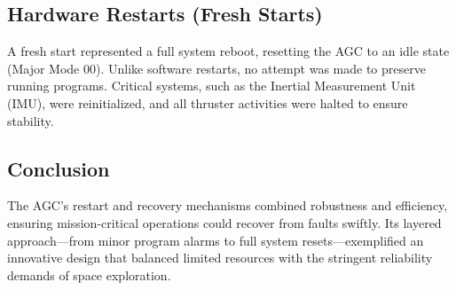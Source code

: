 \documentclass[oxford]{ahsan}
\begin{document}
\subsection{Hardware Restarts (Fresh Starts)}

A fresh start represented a full system reboot, resetting the AGC to an idle state (Major Mode 00). Unlike software restarts, no attempt was made to preserve running programs. Critical systems, such as the Inertial Measurement Unit (IMU), were reinitialized, and all thruster activities were halted to ensure stability.

\subsection{Conclusion}

The AGC's restart and recovery mechanisms combined robustness and efficiency, ensuring mission-critical operations could recover from faults swiftly. Its layered approach—from minor program alarms to full system resets—exemplified an innovative design that balanced limited resources with the stringent reliability demands of space exploration.
\end{document}
